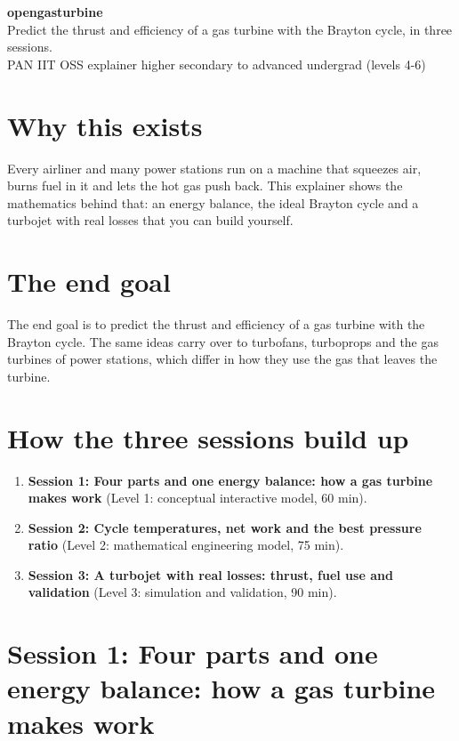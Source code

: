 \documentclass[11pt,a4paper]{article}
\begin{document}
\begin{center}{\LARGE\bfseries opengasturbine}\\[0.4em]{\large Predict the thrust and efficiency of a gas turbine with the Brayton cycle, in three sessions.}\\[0.2em]\small PAN IIT OSS explainer \textbullet{} higher secondary to advanced undergrad (levels 4-6)\end{center}

\section*{Why this exists}
Every airliner and many power stations run on a machine that squeezes air, burns fuel in it and lets the hot gas push back. This explainer shows the mathematics behind that: an energy balance, the ideal Brayton cycle and a turbojet with real losses that you can build yourself.

\section*{The end goal}
The end goal is to predict the thrust and efficiency of a gas turbine with the Brayton cycle. The same ideas carry over to turbofans, turboprops and the gas turbines of power stations, which differ in how they use the gas that leaves the turbine.

\section*{How the three sessions build up}
\begin{enumerate}[nosep]
\item \textbf{Session 1: Four parts and one energy balance: how a gas turbine makes work} (Level 1: conceptual interactive model, 60 min).
\item \textbf{Session 2: Cycle temperatures, net work and the best pressure ratio} (Level 2: mathematical engineering model, 75 min).
\item \textbf{Session 3: A turbojet with real losses: thrust, fuel use and validation} (Level 3: simulation and validation, 90 min).
\end{enumerate}

\section{Session 1: Four parts and one energy balance: how a gas turbine makes work}
\end{document}
